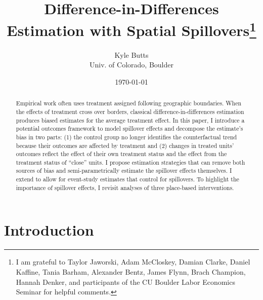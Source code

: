 \documentclass[11pt]{article}
\title{\color{navyblue} Difference-in-Differences Estimation with Spatial Spillovers\thanks{I am grateful to Taylor Jaworski, Adam McCloskey, Damian Clarke, Daniel Kaffine, Tania Barham, Alexander Bentz, James Flynn, Brach Champion, Hannah Denker, and participants of the CU Boulder Labor Economics Seminar for helpful comments.}}
\author{\normalsize Kyle Butts\\{\footnotesize Univ. of Colorado, Boulder}}
\date{\footnotesize\today}
\begin{document}
\begin{titlepage}
    \maketitle
    
    \begin{abstract}
        Empirical work often uses treatment assigned following geographic boundaries. When the effects of treatment cross over borders, classical difference-in-differences estimation produces biased estimates for the average treatment effect. In this paper, I introduce a potential outcomes framework to model spillover effects and decompose the estimate's bias in two parts: (1) the control group no longer identifies the counterfactual trend because their outcomes are affected by treatment and (2) changes in treated units' outcomes reflect the effect of their own treatment status and the effect from the treatment status of ``close'' units. I propose estimation strategies that can remove both sources of bias and semi-parametrically estimate the spillover effects themselves. I extend \citet{Callaway_SantAnna_2020} to allow for event-study estimates that control for spillovers. To highlight the importance of spillover effects, I revisit analyses of three place-based interventions. 
    \end{abstract}
\end{titlepage}



\section{Introduction}
\end{document}

